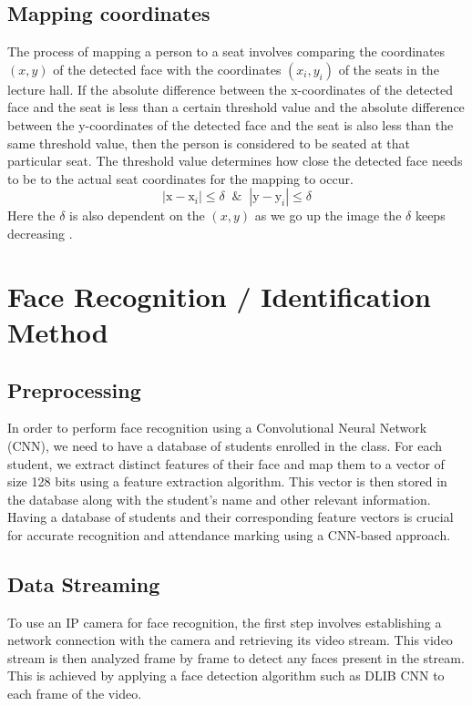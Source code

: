 \subsection{Mapping coordinates}
The process of mapping a person to a seat involves comparing the coordinates $(x,y)$ of the detected face with the coordinates $(x_i,y_i)$ of the seats in the lecture hall. If the absolute difference between the x-coordinates of the detected face and the seat is less than a certain threshold value and the absolute difference between the y-coordinates of the detected face and the seat is also less than the same threshold value, then the person is considered to be seated at that particular seat. The threshold value determines how close the detected face needs to be to the actual seat coordinates for the mapping to occur.
\newline
\begin{equation}
    |\text{x}-\text{x}_i| \leq \delta  \;\; \& \;\; |\text{y}-\text{y}_i| \leq \delta
\end{equation}
Here the $\delta$ is also dependent on the $(x,y)$ as we go up the image the $\delta$ keeps decreasing .

\clearpage
\section{Face Recognition / Identification Method}
\subsection{Preprocessing}
In order to perform face recognition using a Convolutional Neural Network (CNN), we need to have a database of students enrolled in the class. For each student, we extract distinct features of their face and map them to a vector of size 128 bits using a feature extraction algorithm. This vector is then stored in the database along with the student's name and other relevant information.
Having a database of students and their corresponding feature vectors is crucial for accurate recognition and attendance marking using a CNN-based approach.

\subsection{Data Streaming}
To use an IP camera for face recognition, the first step involves establishing a network connection with the camera and retrieving its video stream. This video stream is then analyzed frame by frame to detect any faces present in the stream. This is achieved by applying a face detection algorithm such as DLIB CNN to each frame of the video.

